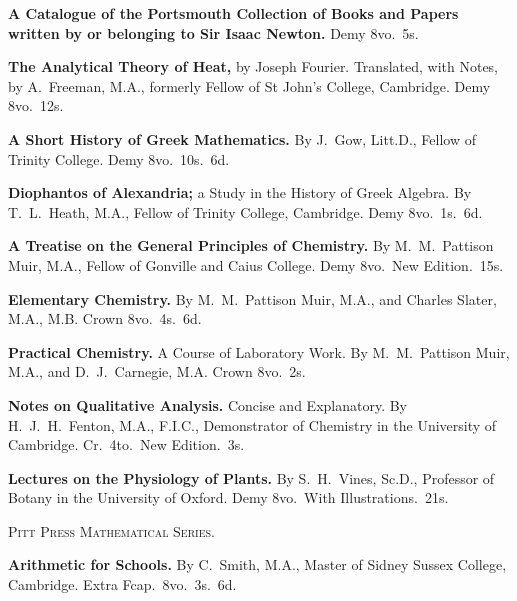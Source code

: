 \documentclass[11pt,a4paper]{article}
\theoremstyle{plain}
\theoremstyle{definition}
\theoremstyle{remark}
\begin{document}
\smallskip

\noindent\textbf{A Catalogue of the Portsmouth Collection of Books and Papers written by or belonging to Sir Isaac Newton.} Demy 8vo.\ 5s.

\smallskip

\noindent\textbf{The Analytical Theory of Heat,} by Joseph Fourier. Translated, with Notes, by A.\ Freeman, M.A., formerly Fellow of St John's College, Cambridge. Demy 8vo.\ 12s.

\smallskip

\noindent\textbf{A Short History of Greek Mathematics.} By J.\ Gow, Litt.D., Fellow of Trinity College. Demy 8vo.\ 10s.\ 6d.

\smallskip

\noindent\textbf{Diophantos of Alexandria;} a Study in the History of Greek Algebra. By T.\ L.\ Heath, M.A., Fellow of Trinity College, Cambridge. Demy 8vo.\ 1s.\ 6d.

\smallskip

\noindent\textbf{A Treatise on the General Principles of Chemistry.} By M.\ M.\ Pattison Muir, M.A., Fellow of Gonville and Caius College. Demy 8vo.\ New Edition.\ 15s.

\smallskip

\noindent\textbf{Elementary Chemistry.} By M.\ M.\ Pattison Muir, M.A., and Charles Slater, M.A., M.B. Crown 8vo.\ 4s.\ 6d.

\smallskip

\noindent\textbf{Practical Chemistry.} A Course of Laboratory Work. By M.\ M.\ Pattison Muir, M.A., and D.\ J.\ Carnegie, M.A. Crown 8vo.\ 2s.

\smallskip

\noindent\textbf{Notes on Qualitative Analysis.} Concise and Explanatory. By H.\ J.\ H.\ Fenton, M.A., F.I.C., Demonstrator of Chemistry in the University of Cambridge. Cr.\ 4to.\ New Edition.\ 3s.

\smallskip

\noindent\textbf{Lectures on the Physiology of Plants.} By S.\ H.\ Vines, Sc.D., Professor of Botany in the University of Oxford. Demy 8vo.\ With Illustrations.\ 21s.

\vspace{12pt}
\begin{center}
\textsc{Pitt Press Mathematical Series.}
\end{center}

\smallskip

\noindent\textbf{Arithmetic for Schools.} By C.\ Smith, M.A., Master of Sidney Sussex College, Cambridge. Extra Fcap.\ 8vo.\ 3s.\ 6d.
\end{document}
